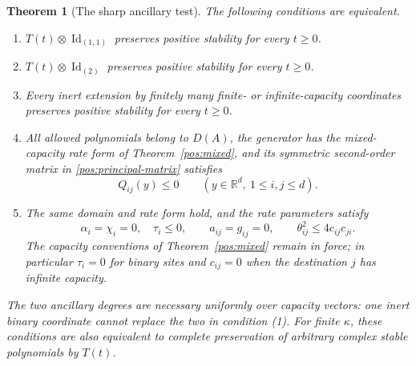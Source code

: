 \documentclass[reqno]{amsart}
\newtheorem{theorem}{Theorem}[section]
\theoremstyle{definition}
\theoremstyle{remark}
\newcommand{\R}{\mathbb R}
\DeclareMathOperator{\Id}{Id}
\begin{document}
\begin{theorem}[The sharp ancillary test]\label{gen:ancilla}
The following conditions are equivalent.
\begin{enumerate}
\item \(T(t)\otimes\Id_{(1,1)}\) preserves positive stability for every
      \(t\geq0\).
\item \(T(t)\otimes\Id_{(2)}\) preserves positive stability for every
      \(t\geq0\).
\item Every inert extension by finitely many finite- or infinite-capacity
      coordinates preserves positive stability for every \(t\geq0\).
\item All allowed polynomials belong to \(D(A)\), the generator has the
      mixed-capacity rate form of Theorem~\ref{pos:mixed}, and its symmetric
      second-order matrix in \eqref{pos:principal-matrix} satisfies
      \begin{equation}\label{gen:eq-entrywise-cone}
       Q_{ij}(y)\leq0\qquad(y\in\R^d,\ 1\leq i,j\leq d).
      \end{equation}
\item The same domain and rate form hold, and the rate parameters satisfy
      \begin{equation}\label{gen:eq-positive-complete-rates}
       \alpha_i=\chi_i=0,\quad \tau_i\leq0,\qquad
       a_{ij}=g_{ij}=0,\qquad
       \theta_{ij}^2\leq4c_{ij}c_{ji}.
      \end{equation}
      The capacity conventions of Theorem~\ref{pos:mixed} remain in force;
      in particular \(\tau_i=0\) for binary sites and \(c_{ij}=0\) when
      the destination \(j\) has infinite capacity.
\end{enumerate}
The two ancillary degrees are necessary uniformly over capacity vectors:
one inert binary coordinate cannot replace the two in condition (1).
For finite \(\kappa\), these conditions are also equivalent to complete
preservation of arbitrary complex stable polynomials by \(T(t)\).
\end{theorem}
\end{document}
